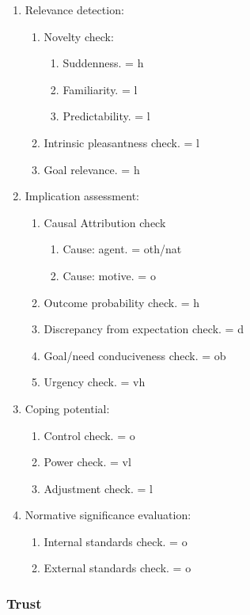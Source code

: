 \begin{enumerate}
\item  Relevance detection:
\begin{enumerate}
\item  Novelty check:
\begin{enumerate}
\item  Suddenness. = h
\item  Familiarity. = l
\item  Predictability. = l
\end{enumerate}
\item  Intrinsic pleasantness check. = l
\item  Goal relevance. = h
\end{enumerate}
\item  Implication assessment:
\begin{enumerate}
\item  Causal Attribution check
\begin{enumerate}
\item  Cause: agent. = oth/nat
\item  Cause: motive. = o
\end{enumerate}
\item  Outcome probability check. = h
\item  Discrepancy from expectation check. = d
\item  Goal/need conduciveness check. = ob
\item  Urgency check. = vh
\end{enumerate}
\item  Coping potential:
\begin{enumerate}
\item  Control check. = o
\item  Power check. = vl
\item  Adjustment check. = l
\end{enumerate}
\item  Normative significance evaluation:
\begin{enumerate}
\item  Internal standards check. = o
\item  External standards check. = o
\end{enumerate}
\end{enumerate}

\subsubsection{Trust}

